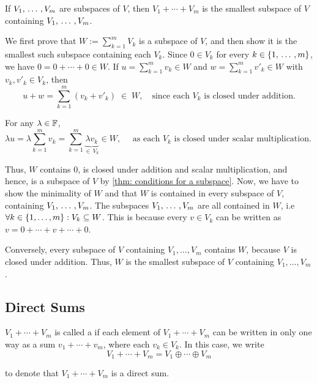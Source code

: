 \setcounter{thm}{39}
\begin{thm} 
  \label{thm: sum of subspaces is the smallest containing subspace}
  If $V_1, {\, \ldots \,\,}, V_m$ are subspaces of $V$, then $V_1 + \cdots + V_m$ is the smallest subspace of $V$ containing $V_1, {\, \ldots \,\,} , V_m$.
\end{thm}
\begin{prf}
  We first prove that $W := \sum_{k=1}^m V_k$  is a subspace of $V$,
  and then show it is the smallest such subspace
  containing each $V_k$.
  Since $0 \in V_k$ for every $k \in \{1, {\, \ldots \,\,}, m\}$, we have $0 = 0 + \cdots + 0 \in W$.
  If
  \(u = \sum_{k=1}^m v_k \in W\) and
  \(w = \sum_{k=1}^m v'_k \in W\)
  with \(v_k, v'_k\in V_k\), then
  \[
    \textstyle
    u + w = \sum_{k=1}^m (v_k + v'_k)\;\in\;W, \quad \text{since each \(V_k\) is closed under addition.}
  \]


  For any $\lambda \in \mathbb{F}$,
  \begin{equation}
      \textstyle
      \lambda u = \lambda \sum_{k=1}^m v_k =  \sum_{k=1}^m \underbrace{\lambda v_k}_{\in \, V_k}  \in W,
      \quad \text{ as each \(V_k\) is closed under scalar multiplication. }
  \end{equation}

  Thus, $W$ contains $0$, is closed under addition and scalar multiplication, and hence, is a subspace of $V$ by \ref{thm: conditions for a subspace}.
  Now, we have to show the minimality of $W$ and that $W$ is contained in every subspace of $V$, containing $V_1, {\, \ldots \,\,}, V_m$.
  The subspaces $V_1, {\, \ldots \,\,}, V_m$ are all contained in $W$, i.e $\forall k \in \{1, \dots, m \}: V_k \subseteq W$. This is because every $v \in V_k$ can be written as $v = 0 + \cdots + v + \cdots + 0$.

  Conversely, every subspace of $V$ containing $V_1, \ldots, V_m$ contains $W$, because $V$ is closed under addition. Thus, $W$ is the smallest subspace of $V$ containing $V_1, \ldots, V_m$.
\end{prf}

\subsection{Direct Sums}

\setcounter{thm}{40}
\begin{mydef}
  \label{def: direct sum}
  $V_1 + \cdots + V_m$ is called a  if each element of $V_1 +\cdots+V_m$ can be written in only one way as a sum $v_1 + \cdots + v_m$, where each $v_k \in V_k$. In this case, we write
  \begin{equation}
     V_1 + \cdots + V_m = V_1 \oplus \cdots \oplus V_m
  \end{equation}

  to denote that $V_1 + \cdots + V_m$ is a direct sum.
\end{mydef}

